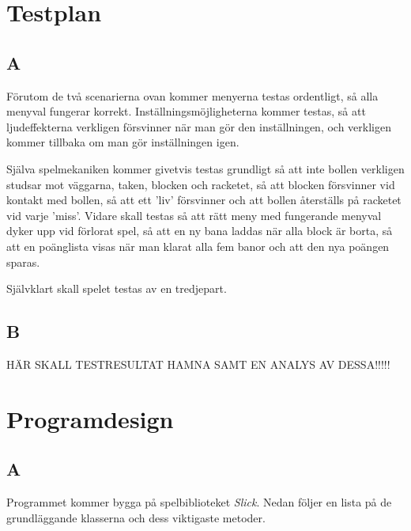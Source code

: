 \documentclass[11pt,a4paper]{article}
\begin{document}
\section{Testplan}

\subsection{A}
Förutom de två scenarierna ovan kommer menyerna testas ordentligt, så alla menyval fungerar korrekt. Inställningsmöjligheterna kommer testas, så att ljudeffekterna verkligen försvinner när man gör den inställningen, och verkligen kommer tillbaka om man gör inställningen igen.

Själva spelmekaniken kommer givetvis testas grundligt så att inte bollen verkligen studsar mot väggarna, taken, blocken och racketet, så att blocken försvinner vid kontakt med bollen, så att ett 'liv' försvinner och att bollen återställs på racketet vid varje 'miss'. Vidare skall testas så att rätt meny med fungerande menyval dyker upp vid förlorat spel, så att en ny bana laddas när alla block är borta, så att en poänglista visas när man klarat alla fem banor och att den nya poängen sparas.

Självklart skall spelet testas av en tredjepart.

\subsection{B}
HÄR SKALL TESTRESULTAT HAMNA SAMT EN ANALYS AV DESSA!!!!!

\section{Programdesign}

\subsection{A}
Programmet kommer bygga på spelbiblioteket \emph{Slick}. Nedan följer en lista på de grundläggande klasserna och dess viktigaste metoder.
\end{document}
